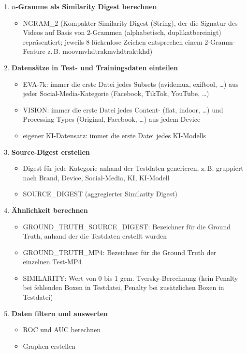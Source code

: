 \begin{enumerate}
    \item \textbf{$n$-Gramme als Similarity Digest berechnen}
    \begin{itemize}
        \item NGRAM\_2 (Kompakter Similarity Digest (String), der die Signatur des Videos auf Basis von 2-Grammen (alphabetisch, duplikatbereinigt) repräsentiert; jeweils 8 lückenlose Zeichen entsprechen einem 2-Gramm-Feature z.\,B. moovmvhdtrakmvhdtraktkhd)
    \end{itemize}
    
    \item \textbf{Datensätze in Test- und Trainingsdaten einteilen}
    \begin{itemize}
        \item EVA-7k: immer die erste Datei jedes Subsets (avidemux, exiftool, \dots) aus jeder Social-Media-Kategorie (Facebook, TikTok, YouTube, \dots)
        \item VISION: immer die erste Datei jedes Content- (flat, indoor, \dots) und Processing-Types (Original, Facebook, \dots) aus jedem Device
        \item eigener KI-Datensatz: immer die erste Datei jedes KI-Modells
    \end{itemize}
    
    \item \textbf{Source-Digest erstellen}
    \begin{itemize}
        \item Digest für jede Kategorie anhand der Testdaten generieren, z.\,B. gruppiert nach Brand, Device, Social-Media, KI, KI-Modell
        \item SOURCE\_DIGEST (aggregierter Similarity Digest)
    \end{itemize}
    
    \item \textbf{Ähnlichkeit berechnen}
    \begin{itemize}
        \item GROUND\_TRUTH\_SOURCE\_DIGEST: Bezeichner für die Ground Truth, anhand der die Testdaten erstellt wurden
        \item GROUND\_TRUTH\_MP4: Bezeichner für die Ground Truth der einzelnen Test-MP4
        \item SIMILARITY: Wert von 0 bis 1 gem. Tversky-Berechnung (kein Penalty bei fehlenden Boxen in Testdatei, Penalty bei zusätzlichen Boxen in Testdatei)
    \end{itemize}
    
    \item \textbf{Daten filtern und auswerten}
    \begin{itemize}
        \item ROC und AUC berechnen
        \item Graphen erstellen
    \end{itemize}
\end{enumerate}

